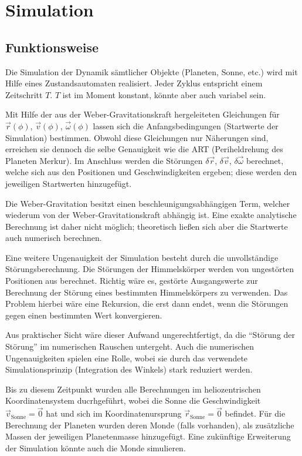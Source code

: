 \documentclass{book}
\begin{document}
\chapter{Simulation}
\section{Funktionsweise}
Die Simulation der Dynamik sämtlicher Objekte (Planeten, Sonne, etc.) wird mit Hilfe eines Zustandsautomaten
realisiert. Jeder Zyklus entspricht einem Zeitschritt $T$. $T$ ist im Moment konstant, könnte aber auch variabel sein.

Mit Hilfe der aus der Weber-Gravitationskraft hergeleiteten Gleichungen für $\vec{r}(\phi)$, $\vec{v}(\phi)$, $\vec{\omega}(\phi)$
lassen sich die Anfangsbedingungen (Startwerte der Simulation) bestimmen. Obwohl diese Gleichungen nur Näherungen sind,
erreichen sie dennoch die selbe Genauigkeit wie die ART (Periheldrehung des Planeten Merkur). Im Anschluss werden die Störungen
$\delta\vec{r}$, $\delta\vec{v}$, $\delta\vec{\omega}$ berechnet, welche sich aus den Positionen und Geschwindigkeiten ergeben;
diese werden den jeweiligen Startwerten hinzugefügt.

Die Weber-Gravitation besitzt einen beschleunigungsabhängigen Term, welcher wiederum von der Weber-Gravitationskraft abhängig ist.
Eine exakte analytische Berechnung ist daher nicht möglich; theoretisch ließen sich aber die Startwerte auch numerisch berechnen.

Eine weitere Ungenauigkeit der Simulation besteht durch die unvollständige Störungsberechnung. Die Störungen der Himmelskörper werden
von ungestörten Positionen aus berechnet. Richtig wäre es, gestörte Ausgangswerte zur Berechnung der Störung eines bestimmten
Himmelskörpers zu verwenden. Das Problem hierbei wäre eine Rekursion, die erst dann endet, wenn die Störungen gegen einen bestimmten
Wert konvergieren.

Aus praktischer Sicht wäre dieser Aufwand ungerechtfertigt, da die \enquote{Störung der Störung} im numerischen Rauschen untergeht.
Auch die numerischen Ungenauigkeiten spielen eine Rolle, wobei sie durch das verwendete Simulationsprinzip (Integration des Winkels)
stark reduziert werden.

Bis zu diesem Zeitpunkt wurden alle Berechnungen im heliozentrischen Koordinatensystem ducrhgeführt, wobei die Sonne die
Geschwindigkeit $\vec{v}_\text{Sonne} = \vec{0}$ hat und sich im Koordinatenursprung $\vec{r}_\text{Sonne} = \vec{0}$ befindet.
Für die Berechnung der Planeten wurden deren Monde (falls vorhanden), als zusätzliche Massen der jeweiligen Planetenmasse hinzugefügt.
Eine zukünftige Erweiterung der Simulation könnte auch die Monde simulieren.
\end{document}
